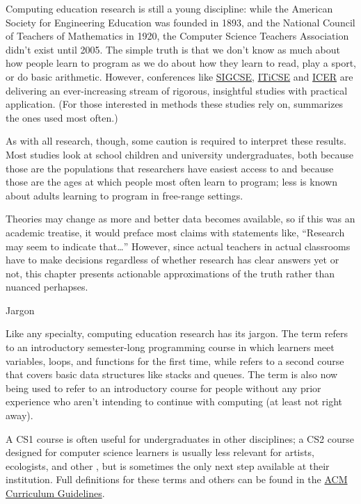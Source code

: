 Computing education research is still a young discipline: while the
American Society for Engineering Education was founded in 1893, and
the National Council of Teachers of Mathematics in 1920, the Computer
Science Teachers Association didn't exist until 2005.  The simple
truth is that we don't know as much about how people learn to program
as we do about how they learn to read, play a sport, or do basic
arithmetic.  However, conferences like
\href{http://sigcse.org/}{SIGCSE},
\href{http://iticse.acm.org/}{ITiCSE} and
\href{https://icer.hosting.acm.org}{ICER} are delivering an
ever-increasing stream of rigorous, insightful studies with practical
application.  (For those interested in methods these studies rely on,
\cite{Ihan2016} summarizes the ones used most often.)

As with all research, though, some caution is required to interpret
these results.  Most studies look at school children and university
undergraduates, both because those are the populations that
researchers have easiest access to \cite{Henr2010} and because those
are the ages at which people most often learn to program; less is
known about adults learning to program in free-range settings.

Theories may change as more and better data becomes available, so if
this was an academic treatise, it would preface most claims with
statements like, ``Research may seem to indicate that{\ldots}''
However, since actual teachers in actual classrooms have to make
decisions regardless of whether research has clear answers yet or not,
this chapter presents actionable approximations of the truth rather
than nuanced perhapses.

\begin{callout}{Jargon}

  Like any specialty, computing education research has its jargon.
  The term  refers to an introductory
  semester-long programming course in which learners meet variables,
  loops, and functions for the first time, while 
  refers to a second course that covers basic data structures like
  stacks and queues.  The term  is also now being
  used to refer to an introductory course for people without any prior
  experience who aren't intending to continue with computing (at least
  not right away).

  A CS1 course is often useful for undergraduates in other
  disciplines; a CS2 course designed for computer science learners is
  usually less relevant for artists, ecologists, and other
  , but is
  sometimes the only next step available at their institution.  Full
  definitions for these terms and others can be found in the
  \href{https://www.acm.org/education/curricula-recommendations}{ACM
    Curriculum Guidelines}.

\end{callout}

